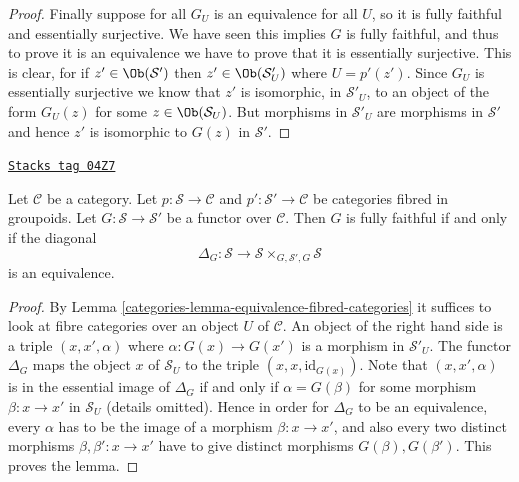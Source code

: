 \begin{proof}
\medskip\noindent
Finally suppose for all $G_U$ is an equivalence for all $U$, so it is
fully faithful and essentially surjective. We have seen this implies $G$ is
fully faithful, and thus to prove it is an equivalence we have to prove that
it is essentially surjective. This is clear, for if $z'\in
\Ob(\mathcal{S}')$ then $z'\in \Ob(\mathcal{S}'_U)$ where
$U = p'(z')$. Since $G_U$ is essentially surjective we know that
$z'$ is isomorphic, in $\mathcal{S}'_U$, to an object of the form
$G_U(z)$ for some $z\in \Ob(\mathcal{S}_U)$. But morphisms
in $\mathcal{S}'_U$ are morphisms in $\mathcal{S}'$ and hence $z'$ is
isomorphic to $G(z)$ in $\mathcal{S}'$.
\end{proof}

\begin{lemma}
\label{categories-lemma-fully-faithful-diagonal-equivalence}
\href{https://stacks.math.columbia.edu/tag/04Z7}{\texttt{Stacks tag 04Z7}}

Let $\mathcal{C}$ be a category. Let $p : \mathcal{S}\to \mathcal{C}$ and
$p' : \mathcal{S'}\to \mathcal{C}$ be categories fibred in groupoids.
Let $G : \mathcal{S}\to \mathcal {S}'$ be a functor over $\mathcal{C}$.
Then $G$ is fully faithful if and only if the diagonal
$$
\Delta_G :
\mathcal{S}
\longrightarrow
\mathcal{S} \times_{G, \mathcal{S}', G} \mathcal{S}
$$
is an equivalence.
\end{lemma}

\begin{proof}

By
Lemma \ref{categories-lemma-equivalence-fibred-categories}
it suffices to look at fibre categories over an object $U$ of $\mathcal{C}$.
An object of the right hand side is a triple $(x, x', \alpha)$ where
$\alpha : G(x) \to G(x')$ is a morphism in $\mathcal{S}'_U$.
The functor $\Delta_G$ maps the object $x$ of $\mathcal{S}_U$
to the triple $(x, x, \text{id}_{G(x)})$. Note that $(x, x', \alpha)$
is in the essential image of $\Delta_G$ if and only if $\alpha = G(\beta)$
for some morphism $\beta : x \to x'$ in $\mathcal{S}_U$ (details omitted).
Hence in order for $\Delta_G$ to be an equivalence, every $\alpha$ has to
be the image of a morphism $\beta : x \to x'$, and also every two
distinct morphisms $\beta, \beta' : x \to x'$ have to give distinct
morphisms $G(\beta), G(\beta')$. This proves the lemma.
\end{proof}

